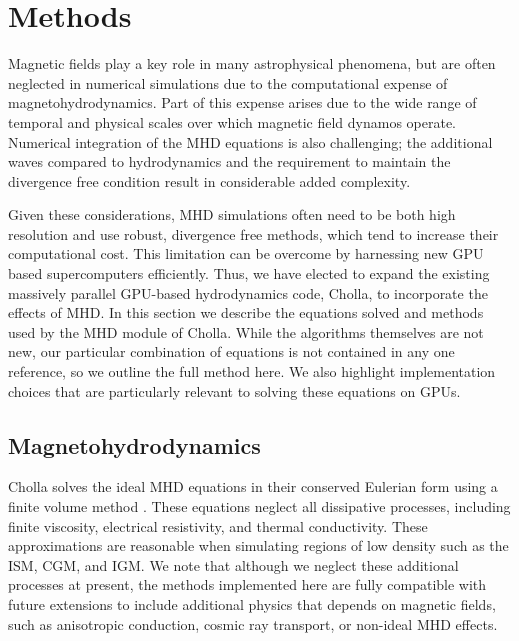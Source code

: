 
\section{Methods}
\label{sec:methods}

Magnetic fields play a key role in many astrophysical phenomena, but are often neglected in numerical simulations due to the computational expense of magnetohydrodynamics. Part of this expense arises due to the wide range of temporal and physical scales over which magnetic field dynamos operate. Numerical integration of the MHD equations is also challenging; the additional waves compared to hydrodynamics and the requirement to maintain the divergence free condition result in considerable added complexity.

Given these considerations, MHD simulations often need to be both high resolution and use robust, divergence free methods, which tend to increase their computational cost. This limitation can be overcome by harnessing new GPU based supercomputers efficiently. Thus, we have elected to expand the existing massively parallel GPU-based hydrodynamics code, Cholla, to incorporate the effects of MHD. In this section we describe the equations solved and methods used by the MHD module of Cholla. While the algorithms themselves are not new, our particular combination of equations is not contained in any one reference, so we outline the full method here. We also highlight implementation choices that are particularly relevant to solving these equations on GPUs.

\subsection{Magnetohydrodynamics}
\label{sec:methods-mhd}

Cholla solves the ideal MHD equations in their conserved Eulerian form using a finite volume method \citep{Godunov}. These equations neglect all dissipative processes, including finite viscosity, electrical resistivity, and thermal conductivity. These approximations are reasonable when simulating regions of low density such as the ISM, CGM, and IGM. We note that although we neglect these additional processes at present, the methods implemented here are fully compatible with future extensions to include additional physics that depends on magnetic fields, such as anisotropic conduction, cosmic ray transport, or non-ideal MHD effects.

